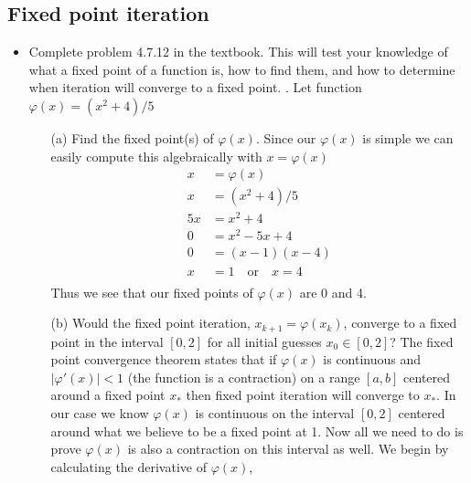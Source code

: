 \documentclass{article}
\begin{document}
\subsection{Fixed point iteration}
\begin{itemize}
    \item Complete problem 4.7.12 in the textbook. This will test your knowledge of what a fixed point of a function is, how to find them, and how to determine when iteration will converge to a fixed point.
    . Let function $\varphi(x) = (x^2 + 4) / 5$  
    \begin{itemize}
        \item[(a)] Find the fixed point(s) of $\varphi(x)$.
        \newline \newline
        Since our $\varphi(x)$ is simple we can easily compute this algebraically with $x = \varphi(x)$
        \begin{equation}
        \begin{split}
            x &= \varphi(x) \\
            x &= (x^2 + 4) / 5 \\
            5x &= x^2 + 4 \\
            0 &= x^2 - 5x + 4 \\
            0 &= (x - 1)(x - 4) \\
            x &= 1 \quad \textrm{or} \quad x = 4 \\
        \end{split}
        \end{equation}
        Thus we see that our fixed points of $\varphi(x)$ are 0 and 4.
        \newline
        \item[(b)] Would the fixed point iteration, $x_{k+1} = \varphi(x_k)$, converge to a fixed point in the interval $[0,2]$ for all initial guesses $x_0 \in [0, 2]$?
        \newline\newline
        The fixed point convergence theorem states that if $\varphi(x)$ is continuous and $|\varphi'(x)| < 1$ (the function is a contraction) on a range $[a, b]$ centered around a fixed point $x_*$ then fixed point iteration will converge to $x_*$. In our case we know $\varphi(x)$ is continuous on the interval $[0, 2]$ centered around what we believe to be a fixed point at 1. Now all we need to do is prove $\varphi(x)$ is also a contraction on this interval as well. We begin by calculating the derivative of $\varphi(x)$,

\end{itemize}
\end{itemize}
\end{document}
